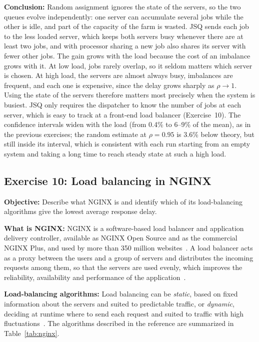 ﻿\documentclass[12pt]{article}
\begin{document}
\textbf{Conclusion:} Random assignment ignores the state of the servers, so the
two queues evolve independently: one server can accumulate several jobs while
the other is idle, and part of the capacity of the farm is wasted. JSQ sends
each job to the less loaded server, which keeps both servers busy whenever
there are at least two jobs, and with processor sharing a new job also shares
its server with fewer other jobs. The gain grows with the load because the cost
of an imbalance grows with it. At low load, jobs rarely overlap, so it seldom
matters which server is chosen. At high load, the servers are almost always
busy, imbalances are frequent, and each one is expensive, since the delay grows
sharply as $\rho\to1$. Using the state of the servers therefore matters most
precisely when the system is busiest. JSQ only
requires the dispatcher to know the number of jobs at each server, which is
easy to track at a front-end load balancer (Exercise~10). The confidence
intervals widen with the load (from 0.4\% to 6--9\% of the mean), as in the
previous exercises; the random estimate at $\rho=0.95$ is 3.6\% below theory,
but still inside its interval, which is consistent with each run starting
from an empty system and taking a long time to reach steady state at such a
high load.

\subsection{Exercise 10: Load balancing in NGINX}

\textbf{Objective:} Describe what NGINX is and identify which of its
load-balancing algorithms give the lowest average response delay.

\textbf{What is NGINX:} NGINX is a software-based load balancer and
application delivery controller, available as NGINX Open Source and as the
commercial NGINX Plus, and used by more than 350 million websites~\cite{f5-lb}.
A load balancer acts as a proxy between the users and a group of servers and
distributes the incoming requests among them, so that the servers are used
evenly, which improves the reliability, availability and performance of the
application~\cite{f5-lb}.

\textbf{Load-balancing algorithms:} Load balancing can be \emph{static}, based
on fixed information about the servers and suited to predictable traffic, or
\emph{dynamic}, deciding at runtime where to send each request and suited to
traffic with high fluctuations~\cite{f5-lb}. The algorithms described in the
reference are summarized in Table~\ref{tab:nginx}.
\end{document}
